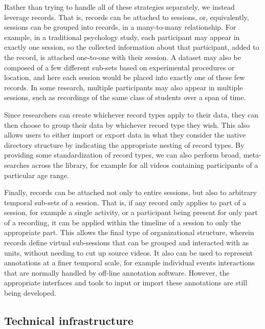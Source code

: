 \documentclass{sig-alternate}
\begin{document}
Rather than trying to handle all of these strategies separately, we instead leverage records.
That is, records can be attached to sessions, or, equivalently, sessions can be grouped into records, in a many-to-many relationship.
For example, in a traditional psychology study, each participant may appear in exactly one session, so the collected information about that participant, added to the record, is attached one-to-one with their session.
A dataset may also be composed of a few different sub-sets based on experimental procedures or location, and here each session would be placed into exactly one of these few records.
In some research, multiple participants may also appear in multiple sessions, such as recordings of the same class of students over a span of time.

Since researchers can create whichever record types apply to their data, they can then choose to group their data by whichever record type they wish.
This also allows users to either import or export data in what they consider the native directory structure by indicating the appropriate nesting of record types.
By providing some standardization of record types, we can also perform broad, meta-searches across the library, for example for all videos containing participants of a particular age range.

Finally, records can be attached not only to entire sessions, but also to arbitrary temporal sub-sets of a session.
That is, if any record only applies to part of a session, for example a single activity, or a participant being present for only part of a recording, it can be applied within the timeline of a session to only the appropriate part.
This allows the final type of organizational structure, wherein records define virtual sub-sessions that can be grouped and interacted with as units, without needing to cut up source videos.
It also can be used to represent annotations at a finer temporal scale, for example individual events interactions that are normally handled by off-line annotation software.
However, the appropriate interfaces and tools to input or import these annotations are still being developed.

\subsection{Technical infrastructure}

\end{document}
